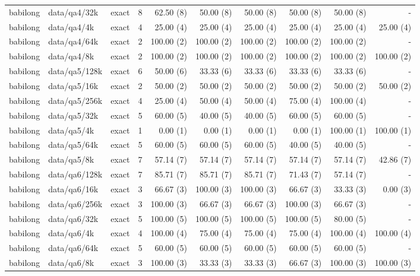 \begin{landscape}
\begin{longtable}{@{}p{19mm}p{52mm}p{25mm}rrrrrrr@{}}
babilong & data/qa4/32k & exact & 8 & 62.50 (8) & 50.00 (8) & 50.00 (8) & 50.00 (8) & 50.00 (8) & - \\
babilong & data/qa4/4k & exact & 4 & 25.00 (4) & 25.00 (4) & 25.00 (4) & 25.00 (4) & 25.00 (4) & 25.00 (4) \\
babilong & data/qa4/64k & exact & 2 & 100.00 (2) & 100.00 (2) & 100.00 (2) & 100.00 (2) & 100.00 (2) & - \\
babilong & data/qa4/8k & exact & 2 & 100.00 (2) & 100.00 (2) & 100.00 (2) & 100.00 (2) & 100.00 (2) & 100.00 (2) \\
babilong & data/qa5/128k & exact & 6 & 50.00 (6) & 33.33 (6) & 33.33 (6) & 33.33 (6) & 33.33 (6) & - \\
babilong & data/qa5/16k & exact & 2 & 50.00 (2) & 50.00 (2) & 50.00 (2) & 50.00 (2) & 50.00 (2) & 50.00 (2) \\
babilong & data/qa5/256k & exact & 4 & 25.00 (4) & 50.00 (4) & 50.00 (4) & 75.00 (4) & 100.00 (4) & - \\
babilong & data/qa5/32k & exact & 5 & 60.00 (5) & 40.00 (5) & 40.00 (5) & 60.00 (5) & 60.00 (5) & - \\
babilong & data/qa5/4k & exact & 1 & 0.00 (1) & 0.00 (1) & 0.00 (1) & 0.00 (1) & 100.00 (1) & 100.00 (1) \\
babilong & data/qa5/64k & exact & 5 & 60.00 (5) & 60.00 (5) & 60.00 (5) & 40.00 (5) & 40.00 (5) & - \\
babilong & data/qa5/8k & exact & 7 & 57.14 (7) & 57.14 (7) & 57.14 (7) & 57.14 (7) & 57.14 (7) & 42.86 (7) \\
babilong & data/qa6/128k & exact & 7 & 85.71 (7) & 85.71 (7) & 85.71 (7) & 71.43 (7) & 57.14 (7) & - \\
babilong & data/qa6/16k & exact & 3 & 66.67 (3) & 100.00 (3) & 100.00 (3) & 66.67 (3) & 33.33 (3) & 0.00 (3) \\
babilong & data/qa6/256k & exact & 3 & 100.00 (3) & 66.67 (3) & 66.67 (3) & 100.00 (3) & 66.67 (3) & - \\
babilong & data/qa6/32k & exact & 5 & 100.00 (5) & 100.00 (5) & 100.00 (5) & 100.00 (5) & 80.00 (5) & - \\
babilong & data/qa6/4k & exact & 4 & 100.00 (4) & 75.00 (4) & 75.00 (4) & 75.00 (4) & 100.00 (4) & 100.00 (4) \\
babilong & data/qa6/64k & exact & 5 & 60.00 (5) & 60.00 (5) & 60.00 (5) & 60.00 (5) & 60.00 (5) & - \\
babilong & data/qa6/8k & exact & 3 & 100.00 (3) & 33.33 (3) & 33.33 (3) & 66.67 (3) & 100.00 (3) & 100.00 (3) \\

\end{longtable}
\end{landscape}
